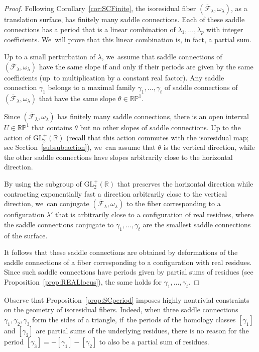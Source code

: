 \begin{proof}
Following Corollary~\ref{cor:SCFinite}, the isoresidual fiber $(\overline{\mathcal{F}}_{\lambda},\omega_{\lambda})$, as a translation surface, has finitely many saddle connections. Each of these saddle connections has a period that is a linear combination of $\lambda_{1},\dots,\lambda_{p}$ with integer coefficients. We~will prove that this linear combination is, in fact, a partial sum.

Up to a small perturbation of $\lambda$, we~assume that saddle connections of $(\overline{\mathcal{F}}_{\lambda},\omega_{\lambda})$ have the same slope if and only if their periods are given by the same coefficients (up~to multiplication by a constant real factor). Any saddle connection $\gamma_{1}$ belongs to a maximal family $\gamma_{1},\dots,\gamma_{t}$ of saddle connections of $(\overline{\mathcal{F}}_{\lambda},\omega_{\lambda})$ that have the same slope $\theta \in \mathbb{RP}^{1}$.

Since $(\overline{\mathcal{F}}_{\lambda},\omega_{\lambda})$ has finitely many saddle connections, there is an open interval $U \in \mathbb{RP}^{1}$ that contains $\theta$ but no other slopes of saddle connections. Up to the action of $\mathrm{GL}_{2}^{+}(\mathbb{R})$ (recall that this action commutes with the isoresidual map; see Section~\ref{subsub:action}), we~can assume that $\theta$ is the vertical direction, while the other saddle connections have slopes arbitrarily close to the horizontal direction.

By using the subgroup of $\mathrm{GL}_{2}^{+}(\mathbb{R})$ that preserves the horizontal direction while contracting exponentially fast a direction arbitrarily close to the vertical direction, we~can conjugate $(\overline{\mathcal{F}}_{\lambda},\omega_{\lambda})$ to the fiber corresponding to a configuration $\lambda'$ that is arbitrarily close to a configuration of real residues, where the saddle connections conjugate to $\gamma_{1},\dots,\gamma_{t}$ are the smallest saddle connections of the surface.

It follows that these saddle connections are obtained by deformations of the saddle connections of a fiber corresponding to a configuration with real residues. Since such saddle connections have periods given by partial sums of residues (see Proposition~\ref{prop:REALlocus}), the same holds for $\gamma_{1},\dots,\gamma_{t}$.
\end{proof}

\begin{rmk}
Observe that Proposition~\ref{prop:SCperiod} imposes highly nontrivial constraints on the geometry of isoresidual fibers. Indeed, when three saddle connections $\gamma_{1},\gamma_{2},\gamma_{3}$ form the sides of a triangle, if~the periods of the homology classes $[\gamma_{1}]$ and $[\gamma_{2}]$ are partial sums of the underlying residues, there is no reason for the period $[\gamma_{3}]=-[\gamma_{1}]-[\gamma_{2}]$ to also be a partial sum of residues.
\end{rmk}

